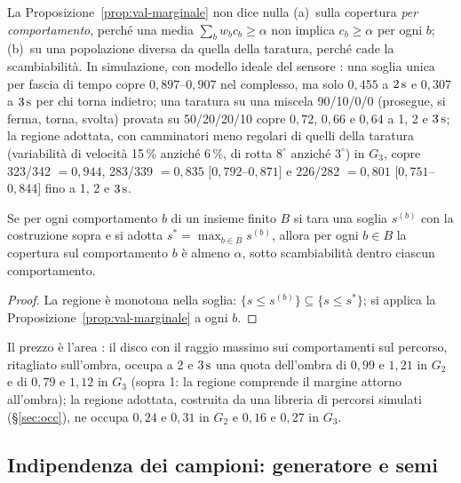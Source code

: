 \begin{osservazione}\label{oss:val-nonvale}
La Proposizione~\ref{prop:val-marginale} non dice nulla (a)~sulla copertura \emph{per comportamento}, perché una media $\sum_bw_bc_b\ge\alpha$ non implica $c_b\ge\alpha$ per ogni $b$; (b)~su una popolazione diversa da quella della taratura, perché cade la scambiabilità. In simulazione, con modello ideale del sensore : una soglia unica per fascia di tempo copre $0{,}897$–$0{,}907$ nel complesso, ma solo $0{,}455$ a $2\,\mathrm{s}$ e $0{,}307$ a $3\,\mathrm{s}$ per chi torna indietro; una taratura su una miscela 90/10/0/0 (prosegue, si ferma, torna, svolta) provata su 50/20/20/10 copre $0{,}72$, $0{,}66$ e $0{,}64$ a 1, 2 e $3\,\mathrm{s}$; la regione adottata, con camminatori meno regolari di quelli della taratura (variabilità di velocità 15\,\% anziché 6\,\%, di rotta $8^\circ$ anziché $3^\circ$) in $G_3$, copre 323/342 $=0{,}944$, 283/339 $=0{,}835$ $[0{,}792$–$0{,}871]$ e 226/282 $=0{,}801$ $[0{,}751$–$0{,}844]$ fino a 1, 2 e $3\,\mathrm{s}$.
\end{osservazione}

\begin{proposizione}\label{prop:val-suolo}
Se per ogni comportamento $b$ di un insieme finito $B$ si tara una soglia $s^{(b)}$ con la costruzione sopra e si adotta $s^\ast=\max_{b\in B}s^{(b)}$, allora per ogni $b\in B$ la copertura sul comportamento $b$ è almeno $\alpha$, sotto scambiabilità dentro ciascun comportamento. 
\end{proposizione}
\begin{proof}
La regione è monotona nella soglia: $\{s\le s^{(b)}\}\subseteq\{s\le s^\ast\}$; si applica la Proposizione~\ref{prop:val-marginale} a ogni $b$.
\end{proof}
Il prezzo è l'area : il disco con il raggio massimo sui comportamenti sul percorso, ritagliato sull'ombra, occupa a 2 e $3\,\mathrm{s}$ una quota dell'ombra di $0{,}99$ e $1{,}21$ in $G_2$ e di $0{,}79$ e $1{,}12$ in $G_3$ (sopra 1: la regione comprende il margine attorno all'ombra); la regione adottata, costruita da una libreria di percorsi simulati (\S\ref{sec:occ}), ne occupa $0{,}24$ e $0{,}31$ in $G_2$ e $0{,}16$ e $0{,}27$ in $G_3$.

\subsection{Indipendenza dei campioni: generatore e semi}\label{sec:val-semi}

